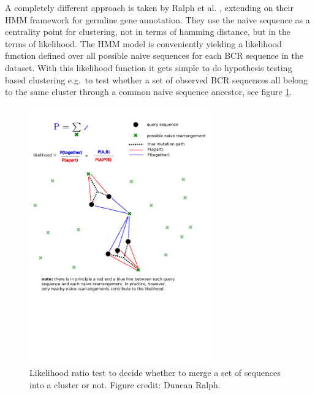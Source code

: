 A completely different approach is taken by Ralph et al. \cite{ralph2016likelihood}, extending on their HMM framework for germline gene annotation.
They use the naive sequence as a centrality point for clustering, not in terms of hamming distance, but in the terms of likelihood.
The HMM model is conveniently yielding a likelihood function defined over all possible naive sequences for each BCR sequence in the dataset.
With this likelihood function it gets simple to do hypothesis testing based clustering e.g.\ to test whether a set of observed BCR sequences all belong to the same cluster through a common naive sequence ancestor, see figure \ref{fig:partis_clustering-with-likelihood_2}.

\begin{figure}
    \centering
    \includegraphics[width=0.7\textwidth]{figures/partis_clustering-with-likelihood_2.pdf}
    \caption{
        \label{fig:partis_clustering-with-likelihood_2}
        Likelihood ratio test to decide whether to merge a set of sequences into a cluster or not. Figure credit: Duncan Ralph.
    }
\end{figure}


